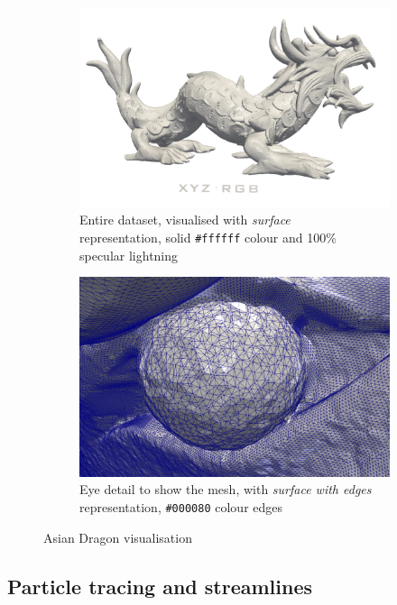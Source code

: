 \documentclass[openany]{article}
\begin{document}
\begin{figure}[h]
	\centering
	\begin{subfigure}{.5\textwidth}
		\centering
		\includegraphics[width=\linewidth]{Asian_Dragon/asian_dragon}
		\caption{Entire dataset, visualised with \textit{surface}  \\
			representation, solid \texttt{\#ffffff} colour and 100\% \\ specular lightning}
	\end{subfigure}%
	\begin{subfigure}{.5\textwidth}
		\centering
		\includegraphics[width=\linewidth]{Asian_Dragon/eye_detail_edges}
		\caption{Eye detail to show the mesh, with \textit{surface with edges} representation, \texttt{\#000080} colour edges}
	\end{subfigure}
	\caption{Asian Dragon visualisation}
\end{figure}

\subsection {Particle tracing and streamlines}
\end{document}
